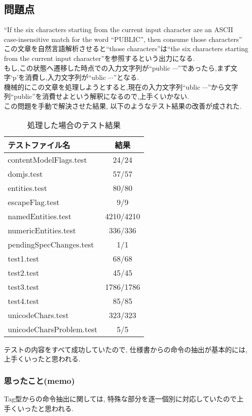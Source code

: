 \documentclass[uplatex,a4j]{jsreport}
\begin{document}
\subsection{問題点}
``If the six characters starting from the current input character are an ASCII case-insensitive match for the word ``PUBLIC'', then consume those characters''
この文章を自然言語解析させると``those characters''は``the six characters starting from the current input character''を参照するという出力になる.\\
もし,この状態へ遷移した時点での入力文字列が``public $\cdots$''であったら,まず文字`p'を消費し,入力文字列が``ublic $\cdots$''となる.\\
機械的にこの文章を処理しようとすると,現在の入力文字列``ublic $\cdots$''から文字列``public''を消費せよという解釈になるので,上手くいかない.\\
この問題を手動で解決させた結果, 以下のようなテスト結果の改善が成された.\\
\begin{table}[htb]
  \begin{center}
    \label{Consumeの処理}
    \caption{処理した場合のテスト結果}
    \begin{tabular}{|l|c|} \hline
      テストファイル名 & 結果 \\ \hline 
      contentModelFlags.test & 24/24  \\
      domjs.test & 57/57  \\
      entities.test & 80/80 \\
      escapeFlag.test & 9/9 \\
      namedEntities.test & 4210/4210 \\
      numericEntities.test & 336/336 \\
      pendingSpecChanges.test & 1/1 \\
      test1.test & 68/68  \\
      test2.test & 45/45 \\
      test3.test & 1786/1786 \\
      test4.test & 85/85 \\ 
      unicodeChars.test & 323/323 \\
      unicodeCharsProblem.test & 5/5 \\ \hline 
    \end{tabular}
  \end{center}
\end{table}
テストの内容をすべて成功していたので, 
仕様書からの命令の抽出が基本的には, 上手くいったと思われる. 

\subsubsection*{思ったこと(memo)}
Tag型からの命令抽出に関しては, 特殊な部分を逐一個別に対応していたので上手くいったと思われる.%
\end{document}
